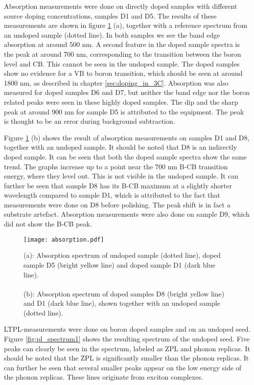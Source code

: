 Absorption measurements were done on directly doped samples with different source doping concentrations, samples D1 and D5. The results of these measurements are shown in figure \ref{fig:abs} (a), together with a reference spectrum from an undoped sample (dotted line). In both samples we see the band edge absorption at around 500 nm. A second feature in the doped sample spectra is the peak at around 700 nm, corresponding to the transition between the boron level and CB. This cannot be seen in the undoped sample. The doped samples show no evidence for a VB to boron transition, which should be seen at around 1800 nm, as described in chapter \ref{sec:doping_in_3C}. Absorption was also measured for doped samples D6 and D7, but neither the band edge nor the boron related peaks were seen in these highly doped samples. The dip and the sharp peak at around 900 nm for sample D5 is attributed to  the equipment. The peak is thought to be an error during background subtraction. 

Figure \ref{fig:abs} (b) shows the result of absorption measurements on samples D1 and D8, together with an undoped sample. It should be noted that D8 is an indirectly doped sample. It can be seen that both the doped sample spectra show the same trend. The graphs increase up to a point near the 700 nm B-CB transition energy, where they level out. This is not visible in the undoped sample. It can further be seen that sample D8 has its B-CB maximum at a slightly shorter wavelength compared to sample D1, which is attributed to the fact that measurements were done on D8 before polishing. The peak shift is in fact a substrate artefact. Absorption measurements were also done on sample D9, which did not show the B-CB peak. 

\begin{figure}[H]
\begin{center}
\texttt{[image: absorption.pdf]}
\caption{
(a): Absorption spectrum of undoped sample (dotted line), doped sample D5 (bright yellow line) and doped sample D1 (dark blue line). \\ \\
(b): Absorption spectrum of doped samples D8 (bright yellow line) and D1 (dark blue line), shown together with an undoped sample (dotted line). 
\label{fig:abs}}
\end{center}
\end{figure}

\newpage
LTPL-measurements were done on boron doped samples and on an undoped seed. Figure \ref{fig:pl_spectrum1} shows the resulting spectrum of the undoped seed. Five peaks can clearly be seen in the spectrum, labeled as ZPL and phonon replicas. It should be noted that the ZPL is significantly smaller than the phonon replicas. It can further be seen that several smaller peaks appear on the low energy side of the phonon replicas. These lines originate from exciton complexes.  

